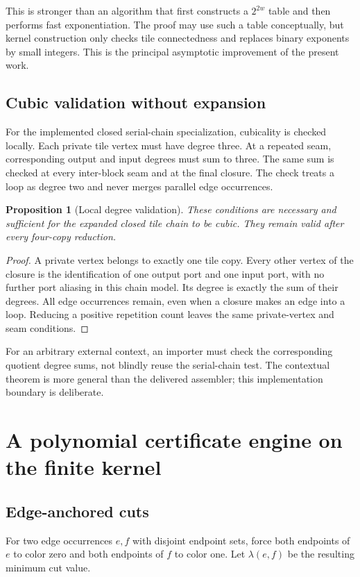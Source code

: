 \documentclass[11pt]{article}
\newtheorem{proposition}[theorem]{Proposition}
\theoremstyle{remark}\newtheorem{remark}[theorem]{Remark}
\begin{document}
This is stronger than an algorithm that first constructs a $2^{2w}$ table and then performs fast exponentiation. The proof may use such a table conceptually, but kernel construction only checks tile connectedness and replaces binary exponents by small integers. This is the principal asymptotic improvement of the present work.

\subsection{Cubic validation without expansion}
For the implemented closed serial-chain specialization, cubicality is checked locally. Each private tile vertex must have degree three. At a repeated seam, corresponding output and input degrees must sum to three. The same sum is checked at every inter-block seam and at the final closure. The check treats a loop as degree two and never merges parallel edge occurrences.

\begin{proposition}[Local degree validation]
These conditions are necessary and sufficient for the expanded closed tile chain to be cubic. They remain valid after every four-copy reduction.
\end{proposition}
\begin{proof}
A private vertex belongs to exactly one tile copy. Every other vertex of the closure is the identification of one output port and one input port, with no further port aliasing in this chain model. Its degree is exactly the sum of their degrees. All edge occurrences remain, even when a closure makes an edge into a loop. Reducing a positive repetition count leaves the same private-vertex and seam conditions.
\end{proof}

For an arbitrary external context, an importer must check the corresponding quotient degree sums, not blindly reuse the serial-chain test. The contextual theorem is more general than the delivered assembler; this implementation boundary is deliberate.

\section{A polynomial certificate engine on the finite kernel}
\subsection{Edge-anchored cuts}
For two edge occurrences $e,f$ with disjoint endpoint sets, force both endpoints of $e$ to color zero and both endpoints of $f$ to color one. Let $\lambda(e,f)$ be the resulting minimum cut value.
\end{document}
